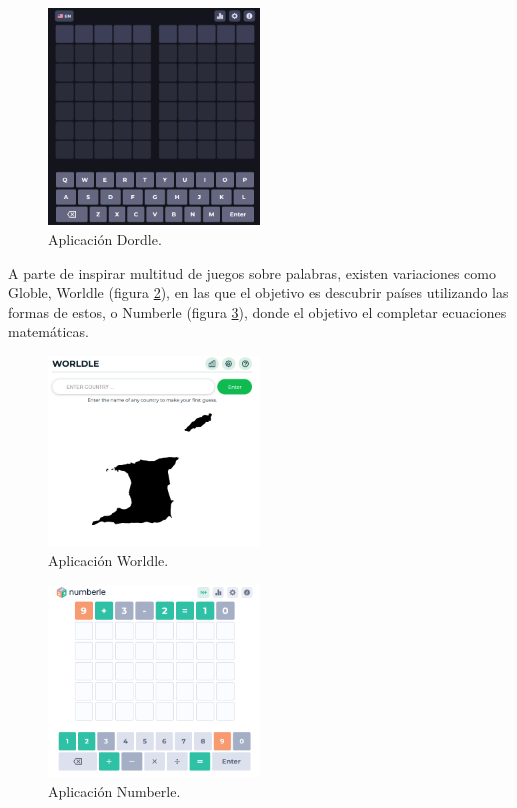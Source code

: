 \begin{figure}
	\centering
	\includegraphics[clip=true,width=0.5\textwidth]{images/dordle.png}
	\caption{Aplicación Dordle.}
	\label{fig:dordle_app}
\end{figure}


A parte de inspirar multitud de juegos sobre palabras, existen variaciones como Globle, Worldle (figura \ref{fig:worldle_app}), en las que el objetivo es descubrir países utilizando las formas de estos, o Numberle (figura \ref{fig:numberle_app}), donde el objetivo el completar ecuaciones matemáticas.

\begin{figure}
	\centering
	\includegraphics[clip=true,width=0.5\textwidth]{images/worldle.png}
	\caption{Aplicación Worldle.}
	\label{fig:worldle_app}
\end{figure}

\begin{figure}
	\centering
	\includegraphics[clip=true,width=0.5\textwidth]{images/numberle.png}
	\caption{Aplicación Numberle.}
	\label{fig:numberle_app}
\end{figure}



